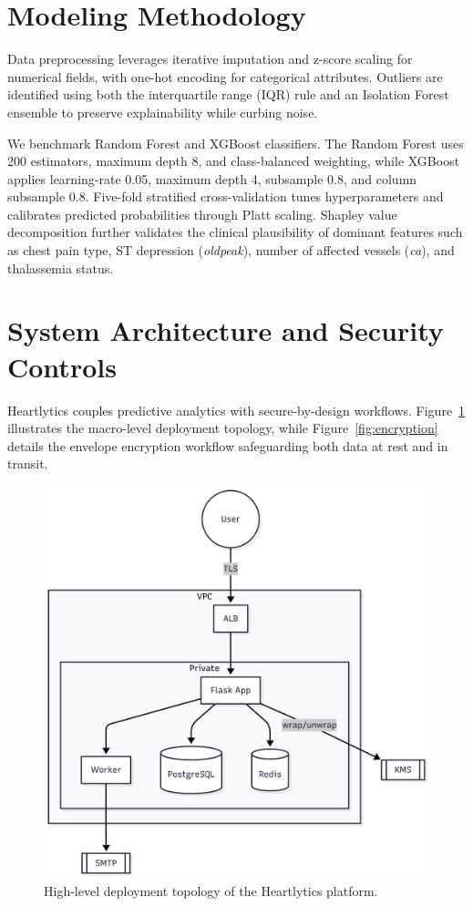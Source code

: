 \documentclass[conference]{IEEEtran}
\begin{document}
\section{Modeling Methodology}
Data preprocessing leverages iterative imputation and z-score scaling for numerical fields, with one-hot encoding for categorical attributes. Outliers are identified using both the interquartile range (IQR) rule and an Isolation Forest ensemble to preserve explainability while curbing noise.

We benchmark Random Forest and XGBoost classifiers. The Random Forest uses 200 estimators, maximum depth 8, and class-balanced weighting, while XGBoost applies learning-rate 0.05, maximum depth 4, subsample 0.8, and column subsample 0.8. Five-fold stratified cross-validation tunes hyperparameters and calibrates predicted probabilities through Platt scaling. Shapley value decomposition further validates the clinical plausibility of dominant features such as chest pain type, ST depression (\textit{oldpeak}), number of affected vessels (\textit{ca}), and thalassemia status.

\section{System Architecture and Security Controls}
Heartlytics couples predictive analytics with secure-by-design workflows. Figure~\ref{fig:topology} illustrates the macro-level deployment topology, while Figure~\ref{fig:encryption} details the envelope encryption workflow safeguarding both data at rest and in transit.

\begin{figure}[t]
  \centering
  \includegraphics[width=0.9\linewidth]{deployment_topology.png}
  \caption{High-level deployment topology of the Heartlytics platform.}
  \label{fig:topology}
\end{figure}
\end{document}

